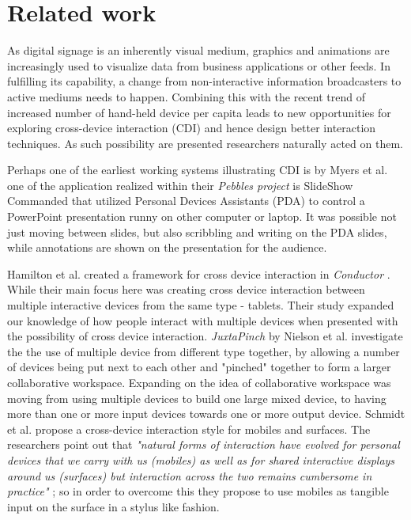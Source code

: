 \section{Related work} \label{sec:relatedwork}

As digital signage is an inherently visual medium, graphics and animations are increasingly used to visualize data from business applications or other feeds.
In fulfilling its capability, a change from non-interactive information broadcasters to active mediums needs to happen.
Combining this with the recent trend of increased number of hand-held device per capita leads to new opportunities for exploring cross-device interaction (CDI) and hence design better interaction techniques.
As such possibility are presented researchers naturally acted on them.

Perhaps one of the earliest working systems illustrating CDI is by Myers et al.
\cite{Myers:2001} one of the application realized within their \emph{Pebbles project} is SlideShow Commanded that utilized Personal Devices Assistants (PDA) to control a PowerPoint presentation runny on other computer or laptop.
It was possible not just moving between slides, but also scribbling and writing on the PDA slides, while annotations are shown on the presentation for the audience.

Hamilton et al. created a framework for cross device interaction in \emph{Conductor} \cite{Hamilton:2014}.
While their main focus here was creating cross device interaction between multiple interactive devices from the same type - tablets.
Their study expanded our knowledge of how people interact with multiple devices when presented with the possibility of cross device interaction.
\emph{JuxtaPinch} by Nielson et al. \cite{Nielsen:2014} investigate the the use of multiple device from different type together, by allowing a number of devices being put next to each other and "pinched" together to form a larger collaborative workspace.
Expanding on the idea of collaborative workspace was moving from using multiple devices to build one large mixed device, to having more than one or more input devices towards one or more output device.
Schmidt et al. propose a cross-device interaction style for mobiles and surfaces.
The researchers point out that \emph{"natural forms of interaction have evolved for personal devices that we carry with us (mobiles) as well as for shared interactive displays around us (surfaces) but interaction across the two remains cumbersome in practice"} \cite{Schmidt:2012}; so in order to overcome this they propose to use mobiles as tangible input on the surface in a stylus like fashion.

